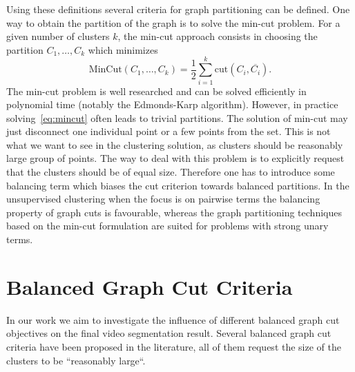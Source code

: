 Using these definitions several criteria for graph partitioning can be defined.
One way to obtain the partition of the graph is to solve the min-cut problem. For a given number of clusters $k$, the min-cut approach consists in choosing the partition  $C_1,\dots,C_k$ which minimizes
\begin{equation}
\label{eq:mincut}
\mathrm{MinCut}(C_1,\dots,C_k) = \frac{1}{2} \sum\limits_{i=1}^k \mathrm{cut}(C_i,\overline{C_i}).
\end{equation}
The min-cut problem is well researched and can be solved efficiently in polynomial time (notably the Edmonds-Karp algorithm). However, in practice solving~\eqref{eq:mincut} often leads to trivial partitions. 
The solution of min-cut may just disconnect one individual point or a few points from the set. This is not what we want to see in the clustering solution, as clusters 
should be reasonably large group of points. The way to deal with this problem is to explicitly request that the clusters should be of equal size. Therefore one has to introduce some balancing term which biases the cut criterion 
towards balanced partitions.  
In the unsupervised clustering when the focus is on pairwise terms the balancing property of graph cuts is favourable, whereas the graph partitioning techniques based on the min-cut formulation are suited for problems
with strong unary terms.
\section{Balanced Graph Cut Criteria}
\label{sec:ch2_balgrcut}
In our work we aim to investigate the influence of different balanced graph cut objectives on the final video segmentation result.
Several balanced graph cut criteria have been proposed in the literature, all of them request the size of the clusters to be ``reasonably large``.

